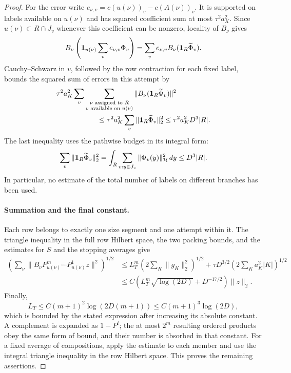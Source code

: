 \begin{proof}
For the error write $e_{\nu,v}=c(u(\nu))_v-c(A(\nu))_v$.  It is supported
on labels available on $u(\nu)$ and has squared coefficient sum at most
$\tau^2a_K^2$.  Since $u(\nu)\subset R\cap J_v$ whenever this coefficient
can be nonzero, locality of $B_\nu$ gives
\[
 B_\nu\left(\mathbf 1_{u(\nu)}\sum_ve_{\nu,v}\Phi_v\right)
       =\sum_ve_{\nu,v}B_\nu(\mathbf 1_R\widetilde\Phi_v).
\]
Cauchy--Schwarz in $v$, followed by the row contraction for each fixed
label, bounds the squared sum of errors in this attempt by
\begin{align*}
 &\tau^2a_K^2
     \sum_v\sum_{\substack{\nu\text{ assigned to }R\\
                            v\text{ available on }u(\nu)}}
           \|B_\nu(\1_R\widetilde\Phi_v)\|^2 \\
 &\hspace{20mm}\le
      \tau^2a_K^2\sum_v\|\1_R\widetilde\Phi_v\|_2^2
      \le\tau^2a_K^2D^3|R|.
\end{align*}
The last inequality uses the pathwise budget in its integral form:
\[
 \sum_v\|\mathbf 1_R\widetilde\Phi_v\|_2^2
   =\int_R\sum_{v:y\in J_v}\|\Phi_v(y)\|_{\mathcal H}^2\,dy
   \le D^3|R|.
\]
In particular, no estimate of the total number of labels on different
branches has been used.

\paragraph{Summation and the final constant.}
Each row belongs to exactly one size segment and one attempt within it.
The triangle inequality in the full row Hilbert space, the two packing
bounds, and the estimates for $S$ and the stopping averages give
\begin{align*}
 \left(\sum_\nu
     \|B_\nu P_{u(\nu)}^m\cdots P_{u(\nu)}^1z\|^2\right)^{1/2}
 &\le
    L_T^m\left(2\sum_K\|g_K\|_2^2\right)^{1/2}
    +\tau D^{3/2}
          \left(2\sum_Ka_K^2|K|\right)^{1/2} \\
 &\le C\left(L_T^m\sqrt{\log(2D)}+D^{-17/2}\right)\|z\|_2.
\end{align*}
Finally,
\[
 L_T\le C(m+1)^2\log(2D(m+1))
       \le C(m+1)^3\log(2D),
\]
which is bounded by the stated expression after increasing its absolute
constant.  A complement is expanded as $1-P^i$; the at most $2^m$ resulting
ordered products obey the same form of bound, and their number is absorbed
in that constant.  For a fixed average of compositions, apply the estimate
to each member and use the integral triangle inequality in the row Hilbert
space.  This proves the remaining assertions.
\end{proof}

